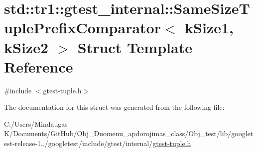 \hypertarget{structstd_1_1tr1_1_1gtest__internal_1_1_same_size_tuple_prefix_comparator}{}\section{std\+::tr1\+::gtest\+\_\+internal\+::Same\+Size\+Tuple\+Prefix\+Comparator$<$ k\+Size1, k\+Size2 $>$ Struct Template Reference}
\label{structstd_1_1tr1_1_1gtest__internal_1_1_same_size_tuple_prefix_comparator}


{\ttfamily \#include $<$gtest-\/tuple.\+h$>$}



The documentation for this struct was generated from the following file\+:\begin{DoxyCompactItemize}
\item 
C\+:/\+Users/\+Mindaugas K/\+Documents/\+Git\+Hub/\+Obj\+\_\+\+Duomenu\+\_\+apdorojimas\+\_\+class/\+Obj\+\_\+test/lib/googletest-\/release-\/1../googletest/include/gtest/internal/\mbox{\hyperlink{gtest-tuple_8h}{gtest-\/tuple.\+h}}\end{DoxyCompactItemize}
